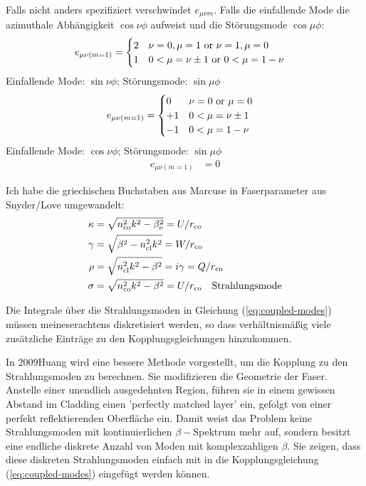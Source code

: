\documentclass{article}
\newcommand{\nco}{n_\textrm{co}}
\newcommand{\rco}{r_\textrm{co}}
\newcommand{\ncl}{n_\textrm{cl}}
\begin{document}
Falls nicht anders spezifiziert verschwindet $e_{\mu\nu m}$.  Falls
die einfallende Mode die azimuthale Abh\"angigkeit $\cos\nu\phi$
aufweist und die St\"orungsmode $\cos\mu\phi$:
\begin{align}
  e_{\mu\nu (m=1)} &= \begin{cases} 
    2 & \nu = 0, \mu = 1\ \textnormal{or}\ \nu = 1, \mu = 0  \\
    1 & 0<\mu = \nu \pm 1\ \textnormal{or}\ 0<\mu=1-\nu 
  \end{cases}
\end{align}
Einfallende Mode:  $\sin\nu\phi$; St\"orungsmode: $\sin\mu\phi$
\begin{align}
  e_{\mu\nu (m=1)} &= \begin{cases} 
    0 & \nu = 0\ \textnormal{or}\ \mu=0 \\ 
    +1 & 0<\mu = \nu \pm 1\\
    -1 & 0<\mu=1-\nu 
  \end{cases}
\end{align}
Einfallende Mode:  $\cos\nu\phi$; St\"orungsmode: $\sin\mu\phi$
\begin{align}
  e_{\mu\nu (m=1)} &= 0
\end{align}



Ich habe die griechischen Buchstaben aus Marcuse in Faserparameter aus
Snyder/Love umgewandelt:
\begin{align}
  \kappa &= \sqrt{\nco^2 k^2-\beta_\nu^2} = U/\rco \\
  \gamma &= \sqrt{\beta^2-\ncl^2 k^2} = W/\rco \\
  \rho &= \sqrt{\ncl^2 k^2-\beta^2} = i\gamma = Q/\rco  \\
  \sigma &= \sqrt{\nco^2 k^2-\beta^2} = U/\rco\quad \textnormal{Strahlungsmode} 
\end{align}

Die Integrale \"uber die Strahlungsmoden in Gleichung
(\ref{eq:coupled-modes}) m\"ussen meineserachtens diskretisiert
werden, so dass verh\"altnism\"a\ss ig viele zus\"atzliche Eintr\"age
zu den Kopplungsgleichungen hinzukommen.

In 2009Huang wird eine bessere Methode vorgestellt, um die Kopplung zu
den Strahlungsmoden zu berechnen. Sie modifizieren die Geometrie der
Faser. Anstelle einer unendlich ausgedehnten Region, f\"uhren sie in
einem gewissen Abstand im Cladding einen 'perfectly matched layer'
ein, gefolgt von einer perfekt reflektierenden Oberfl\"ache ein. Damit
weist das Problem keine Strahlungsmoden mit kontinuierlichen
$\beta-$Spektrum mehr auf, sondern besitzt eine endliche diskrete
Anzahl von Moden mit komplexzahligen $\beta$. Sie zeigen, dass diese
diskreten Strahlungsmoden einfach mit in die Kopplungsgleichung
(\ref{eq:coupled-modes}) eingef\"ugt werden k\"onnen.
\end{document}
